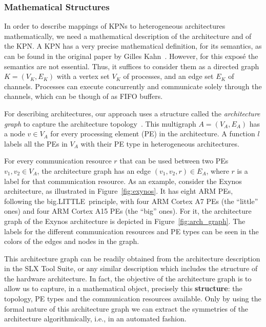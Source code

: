 \documentclass{article}
\begin{document}
\subsubsection{Mathematical Structures}

In order to describe mappings of KPNs to heterogeneous architectures mathematically, we need a mathematical description of the architecture and of the KPN. 
A KPN has a very precise mathematical definition, for its semantics, as can be found in the original paper by Gilles Kahn~\cite{kahn74}. However, for this exposé the semantics are not essential. Thus, it suffices to consider them as a directed
graph $K = (V_K,E_K)$ with a vertex set $V_K$ of processes, and an edge set $E_K$ of channels. Processes can execute concurrently and communicate solely through the channels, which can be though of as FIFO buffers.

For describing architectures, our approach uses a structure called the \emph{architecture graph} to capture the architecture topology~\cite{castrillon2012}. This multigraph $A = (V_A, E_A)$ has a node $v \in V_A$ for every processing element (PE) in the architecture.
A function $l$ labels all the PEs in $V_A$ with their PE type in heterogeneous architectures.

For every communication resource $r$ that can be used between two PEs $v_1, v_2 \in V_A$, the architecture graph has an edge $(v_1,v_2,r) \in E_A$, where $r$ is a label for that communication resource.
As an example, consider the Exynos architecture, as illustrated in Figure~\ref{fig:exynos}.
It has eight ARM PEs, following the big.LITTLE\texttrademark~principle, with four ARM Cortex A7 PEs (the ``little'' ones) and four ARM Cortex A15 PEs (the ``big'' ones). 
For it, the architecture graph of the Exynos architecture is depicted in Figure~\ref{fig:arch_graph}. The labels for the different communication resources and PE types can be seen in the colors of the edges and nodes in the graph.

This architecture graph can be readily obtained from the architecture description in the SLX Tool Suite, or any similar description which includes the structure of the hardware architecture. 
In fact, the objective of the architecture graph is to allow us to capture, in a mathematical object, precisely this \textbf{structure}: the topology, PE types and the communication resources available.
Only by using the formal nature of this architecture graph we can extract the symmetries of the architecture algorithmically, i.e., in an automated fashion.
\end{document}

